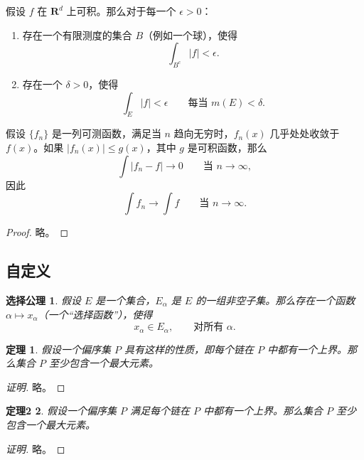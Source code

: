 \begin{proposition}
  假设 $f$ 在 $\mathbf{R}^d$ 上可积。那么对于每一个 $\epsilon > 0$：
  \begin{enumerate}
    \renewcommand{\theenumi}{\roman{enumi}}
    \item 存在一个有限测度的集合 $B$（例如一个球），使得
    \begin{equation}
    \int_{B^c} |f| < \epsilon.
    \end{equation}
    \item 存在一个 $\delta > 0$，使得
    \begin{equation}
    \int_E |f| < \epsilon \qquad \text{每当~} m(E) < \delta.
    \end{equation}
  \end{enumerate}
\end{proposition}

\begin{theorem}
  假设 $\{f_n\}$ 是一列可测函数，满足当 $n$ 趋向无穷时，$f_n(x)$ 几乎处处收敛于 $f(x)$。如果 $|f_n(x)| \leq g(x)$，其中 $g$ 是可积函数，那么
  \begin{equation}
  \int |f_n - f| \to 0 \qquad \text{当~} n \to \infty,
  \end{equation}
  因此
  \begin{equation}
  \int f_n \to \int f \qquad \text{当~} n \to \infty.
  \end{equation}
\end{theorem}

\begin{proof}
  略。
\end{proof}

\subsection{自定义}

\newtheorem*{axiomofchoice}{选择公理}
\begin{axiomofchoice}
  假设 $E$ 是一个集合，${E_\alpha}$ 是 $E$ 的一组非空子集。那么存在一个函数 $\alpha \mapsto x_\alpha$（一个“选择函数”），使得
  \begin{equation}
  x_\alpha \in E_\alpha,\qquad \text{对所有 }\alpha.
  \end{equation}
\end{axiomofchoice}

\newtheorem{observation}{定理}[chapter]
\begin{observation}
  假设一个偏序集 $P$ 具有这样的性质，即每个链在 $P$ 中都有一个上界。那么集合 $P$ 至少包含一个最大元素。
\end{observation}
\begin{proof}[证明]
  略。
\end{proof}

\newtheorem{observationvar2}[observation]{定理2}
\begin{observationvar2}
  假设一个偏序集 $P$ 满足每个链在 $P$ 中都有一个上界。那么集合 $P$ 至少包含一个最大元素。
\end{observationvar2}
\begin{proof}[证明]
  略。
\end{proof}

\clearpage

